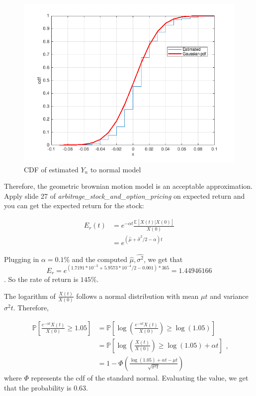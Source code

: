 \documentclass{cisXXX} %
\begin{document}
\begin{figure}
  \includegraphics[width=\linewidth]{C2.png}
\caption{CDF of estimated $Y_n$ to normal model} 
  \label{fig:C2}
\end{figure}

Therefore, the geometric brownian motion model is an acceptable approximation. 
\HWproblem
Apply slide 27 of \textit{arbitrage\_stock\_and\_option\_pricing} on expected return and you can get the expected return for the stock:

$$
\begin{aligned} E _ { r } \left( t \right) & = e ^ { - \alpha t } \frac { \mathbb { E } [ X ( t ) | X ( 0 ) ] } { X ( 0 ) } \\ & = e ^ { \left( \hat { \mu } + \hat { \sigma } ^ { 2 } / 2 - \alpha \right) t } \end{aligned}
$$

Plugging in $\alpha = 0.1\%$ and the computed $\hat { \mu }, \hat { \sigma^2 }$, we get that 
$$ E _ { r } = e^{(1.7191*10^{-3} + 5.9573*10^{-4} / 2 -0.001) * 365} = 1.44946166$$.
So the rate of return is $145\%$.

The logarithm of $\frac { X ( t ) } { X ( 0 ) }$ follows a normal distribution with mean $\mu t$ and variance $\sigma^2 t$. Therefore,

$$
\begin{aligned} \mathbb { P } \left[ \frac { e ^ { - \alpha t } X ( t ) } { X ( 0 ) } \geq 1.05 \right] & = \mathbb { P } \left[ \log \left( \frac { e ^ { - \alpha t } X ( t ) } { X ( 0 ) } \right) \geq \log ( 1.05 ) \right] \\ & = \mathbb { P } \left[ \log \left( \frac { X ( t ) } { X ( 0 ) } \right) \geq \log ( 1.05 ) + \alpha t \right] \\ & = 1 - \Phi \left( \frac { \log ( 1.05 ) + \alpha t - \mu t } { \sqrt { \sigma ^ { 2 } t } } \right) \end{aligned},
$$
where $\Phi$ represents the cdf of the standard normal. Evaluating the value, we get that the probability is $0.63$.
\end{document}
